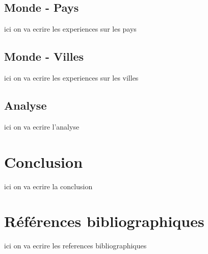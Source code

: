 \documentclass {article}
\begin{document}
\subsection {Monde - Pays}
ici on va ecrire les experiences sur les pays

\subsection {Monde - Villes}
ici on va ecrire les experiences sur les villes

\subsection {Analyse}
ici on va ecrire l'analyse

\section {Conclusion}
ici on va ecrire la conclusion

\section {Références bibliographiques}
ici on va ecrire les references bibliographiques
\end{document}
